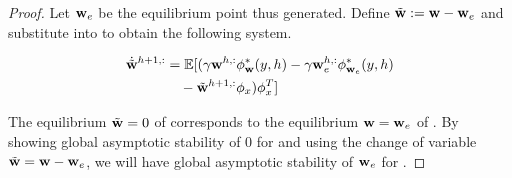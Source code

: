 \begin{appendices}
\begin{proof}
Let $\mathbf{w}_e$ be the equilibrium point thus generated. Define $\tilde{\mathbf{w}} := \mathbf{w} - \mathbf{w}_e$ and substitute into  to obtain the following system.


\begin{align}\label{eq:new-ode}
    \dot{\tilde{\mathbf{w}}}^{h + 1, :} &=  \mathbb{E}[(\gamma \mathbf{w}^{h, :} \phi^*_{\mathbf{w}}(y, h) - \gamma \mathbf{w}_e^{h, :} \phi^*_{\mathbf{w}_e}(y, h) \\
    &\quad - \tilde{\mathbf{w}}^{h + 1, :} \phi_x)\phi_x^T] \nonumber
\end{align}

\noindent The equilibrium $\tilde{\mathbf{w}} = 0$ of  corresponds to the equilibrium $\mathbf{w} = \mathbf{w}_e$ of . By showing global asymptotic stability of 0 for  and using the change of variable $\tilde{\mathbf{w}} = \mathbf{w} - \mathbf{w}_e$, we will have global asymptotic stability of $\mathbf{w}_e$ for .


\end{proof}
\end{appendices}
